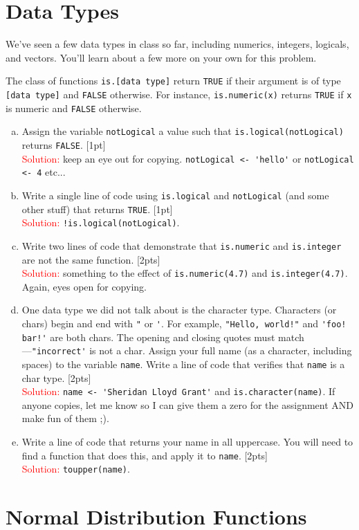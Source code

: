 \documentclass[12pt]{article}
\newcommand{\ans}{\\\textcolor{red}{Solution: }}
\begin{document}
\section{Data Types}

We've seen a few data types in class so far, including numerics, integers, logicals, and vectors. You'll learn about a few more on your own for this problem.

The class of functions \verb|is.[data type]| return \verb|TRUE| if their argument is of type \verb|[data type]| and \verb|FALSE| otherwise. For instance, \verb|is.numeric(x)| returns \verb|TRUE| if \verb|x| is numeric and \verb|FALSE| otherwise.

\begin{enumerate}[(a)]
\item Assign the variable \verb|notLogical| a value such that \verb|is.logical(notLogical)| returns \verb|FALSE|. [1pt] \ans keep an eye out for copying. \verb|notLogical <- 'hello'| or \verb|notLogical <- 4| etc...
\item Write a single line of code using \verb|is.logical| and \verb|notLogical| (and some other stuff) that returns \verb|TRUE|. [1pt] \ans \verb|!is.logical(notLogical)|.
\item Write two lines of code that demonstrate that \verb|is.numeric| and \verb|is.integer| are not the same function. [2pts] \ans something to the effect of \verb|is.numeric(4.7)| and \verb|is.integer(4.7)|. Again, eyes open for copying.
\item One data type we did not talk about is the character type. Characters (or chars) begin and end with \verb|"| or \verb|'|. For example, \verb|"Hello, world!"| and \verb|'foo! bar!'| are both chars. The opening and closing quotes must match---\verb|"incorrect'| is not a char. Assign your full name (as a character, including spaces) to the variable \verb|name|. Write a line of code that verifies that \verb|name| is a char type. [2pts] \ans \verb|name <- 'Sheridan Lloyd Grant'| and \verb|is.character(name)|. If anyone copies, let me know so I can give them a zero for the assignment AND make fun of them ;).
\item Write a line of code that returns your name in all uppercase. You will need to find a function that does this, and apply it to \verb|name|. [2pts] \ans \verb|toupper(name)|.
\end{enumerate}

\section{Normal Distribution Functions}
\end{document}
